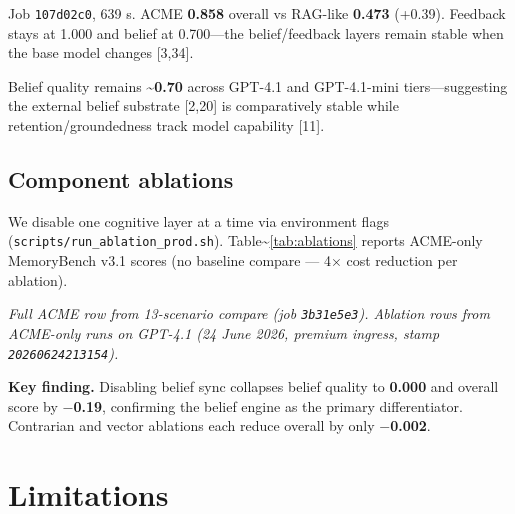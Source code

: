 \documentclass[11pt,a4paper]{article}
\begin{document}
Job \texttt{107d02c0}, 639 s. ACME \textbf{0.858} overall vs RAG-like
\textbf{0.473} (+0.39). Feedback stays at 1.000 and belief at
0.700---the belief/feedback layers remain stable when the base model
changes {[}3,34{]}.

\acmeTableMini

Belief quality remains \textbf{\textasciitilde0.70} across GPT-4.1 and
GPT-4.1-mini tiers---suggesting the external belief substrate {[}2,20{]}
is comparatively stable while retention/groundedness track model
capability {[}11{]}.

\subsection{Component ablations}\label{component-ablations}

We disable one cognitive layer at a time via environment flags
(\texttt{scripts/run\_ablation\_prod.sh}).
Table\textasciitilde{}\ref{tab:ablations} reports ACME-only MemoryBench
v3.1 scores (no baseline compare --- 4\(\times\) cost reduction per
ablation).

\acmeTableAblations

\emph{Full ACME row from 13-scenario compare (job \texttt{3b31e5e3}).
Ablation rows from ACME-only runs on GPT-4.1 (24 June 2026, premium
ingress, stamp \texttt{20260624213154}).}

\begin{keyfinding}
\textbf{Key finding.} Disabling belief sync collapses belief quality to \textbf{0.000} and overall score by \textbf{$-$0.19}, confirming the belief engine as the primary differentiator. Contrarian and vector ablations each reduce overall by only \textbf{$-$0.002}.
\end{keyfinding}

\section{Limitations}\label{limitations}
\end{document}
